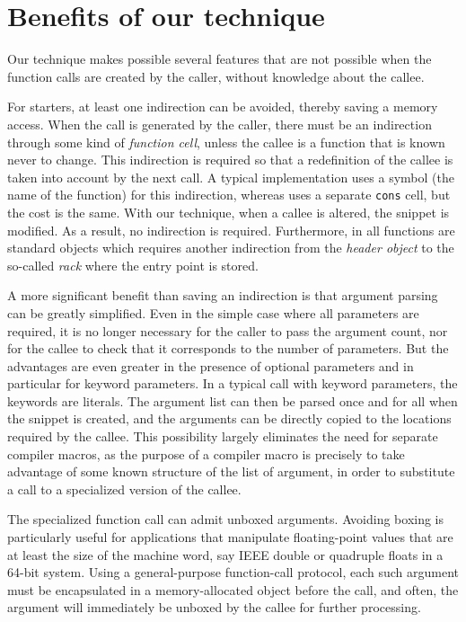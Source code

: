 \section{Benefits of our technique}
\label{sec-benefits}

Our technique makes possible several features that are not possible
when the function calls are created by the caller, without knowledge
about the callee.

For starters, at least one indirection can be avoided, thereby saving
a memory access.  When the call is generated by the caller, there must
be an indirection through some kind of \emph{function cell}, unless the
callee is a function that is known never to change.  This indirection
is required so that a redefinition of the callee is taken into account
by the next call.  A typical \commonlisp{} implementation uses a
symbol (the name of the function) for this indirection, whereas
\sicl{} uses a separate \texttt{cons} cell, but the cost is the same.
With our technique, when a callee is altered, the snippet is
modified.  As a result, no indirection is required.  Furthermore, in
\sicl{} all functions are standard objects which requires another
indirection from the \emph{header object} to the so-called \emph{rack}
where the entry point is stored.

A more significant benefit than saving an indirection is that argument
parsing can be greatly simplified.  Even in the simple case where all
parameters are required, it is no longer necessary for the caller to
pass the argument count, nor for the callee to check that it
corresponds to the number of parameters.  But the advantages are even
greater in the presence of optional parameters and in particular for
keyword parameters.  In a typical call with keyword parameters, the
keywords are literals.  The argument list can then be parsed once and
for all when the snippet is created, and the arguments can be directly
copied to the locations required by the callee.  This possibility
largely eliminates the need for separate compiler macros, as the
purpose of a compiler macro is precisely to take advantage of some
known structure of the list of argument, in order to substitute a call
to a specialized version of the callee.

The specialized function call can admit unboxed arguments.  Avoiding
boxing is particularly useful for applications that manipulate
floating-point values that are at least the size of the machine word,
say IEEE double or quadruple floats in a 64-bit system.  Using a
general-purpose function-call protocol, each such argument must be
encapsulated in a memory-allocated object before the call, and often,
the argument will immediately be unboxed by the callee for further
processing.

